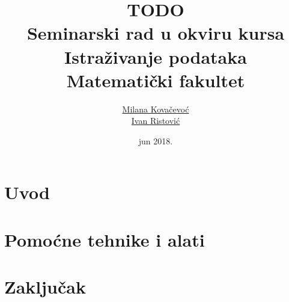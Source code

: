 \documentclass[a4paper]{article}
\begin{document}
\title{TODO\\ \small{Seminarski rad u okviru kursa\\Istra\v{z}ivanje podataka\\ Matematički fakultet}}

\author{\href{mailto:mi14031@matf.bg.ac.rs}{Milana Kova\v{c}evo\'c}\\\href{mailto:mi14042@matf.bg.ac.rs}{Ivan Ristovi\'c}}
\date{jun 2018.}

\maketitle


\tableofcontents

\newpage

\section{Uvod}
\label{sec:Uvod}



\section{Pomoćne tehnike i alati}
\label{sec:PomocneTehnike}

\cite{KNIME}
\cite{SPSS}


\section{Zaključak}
\label{sec:Zakljucak}



\appendix



\end{document}
